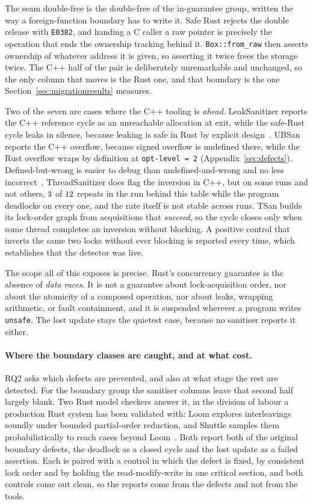 \documentclass[english,oneside,a4paper,censored,csm,software-track-2020]{HYthesisML}
\begin{document}
The seam double-free is the double-free of the in-guarantee group, written the way a
foreign-function boundary has to write it. Safe Rust rejects the double release with
\texttt{E0382}, and handing a C caller a raw pointer is precisely the operation that ends the
ownership tracking behind it. \texttt{Box::from\_raw} then asserts ownership of whatever address
it is given, so asserting it twice frees the storage twice. The C++ half of the pair is
deliberately unremarkable and unchanged, so the only column that moves is the Rust one, and that
boundary is the one Section~\ref{sec:migrationresults} measures.

Two of the seven are cases where the C++ tooling is \emph{ahead}. LeakSanitizer reports the C++
reference cycle as an unreachable allocation at exit, while the safe-Rust cycle leaks in silence,
because leaking is safe in Rust by explicit design~\cite{hughes2025gcrust,cui2024rcanary}. UBSan
reports the C++ overflow, because signed overflow is undefined there, while the Rust overflow
wraps by definition at \texttt{opt-level~=~2} (Appendix~\ref{sec:defects}). Defined-but-wrong is
easier to debug than undefined-and-wrong and no less incorrect~\cite{dietz2015overflow}.
ThreadSanitizer does flag the inversion in C++, but on some runs and not others,
$3$ of $12$ repeats in the run behind this table while the program
deadlocks on every one, and the rate itself is not stable across runs. TSan builds its lock-order
graph from acquisitions that \emph{succeed}, so the cycle closes only when some thread completes
an inversion without blocking. A positive control that inverts the same two locks without ever
blocking is reported every time, which establishes that the detector was live.

The scope all of this exposes is precise. Rust's concurrency guarantee is the absence of
\emph{data races}. It is not a guarantee about lock-acquisition order, nor about the atomicity of a
composed operation, nor about leaks, wrapping arithmetic, or fault containment, and it is
suspended wherever a program writes \texttt{unsafe}. The lost update stays the quietest case,
because no sanitiser reports it either.

\paragraph{Where the boundary classes are caught, and at what cost.}
RQ2 asks which defects are prevented, and also at what stage the rest are detected. For
the boundary group the sanitiser columns leave that second half largely blank. Two Rust model
checkers answer it, in the division of labour a production Rust system has been validated
with: Loom explores interleavings soundly under bounded partial-order reduction, and Shuttle
samples them probabilistically to reach cases beyond Loom~\cite{bornholt2021shardstore}. Both
report both of the original boundary defects, the deadlock as a closed cycle and the lost update
as a failed assertion. Each is paired with a control in which the defect is fixed, by consistent
lock order and by holding the read-modify-write in one critical section, and both controls come
out clean, so the reports come from the defects and not from the tools.
\end{document}
